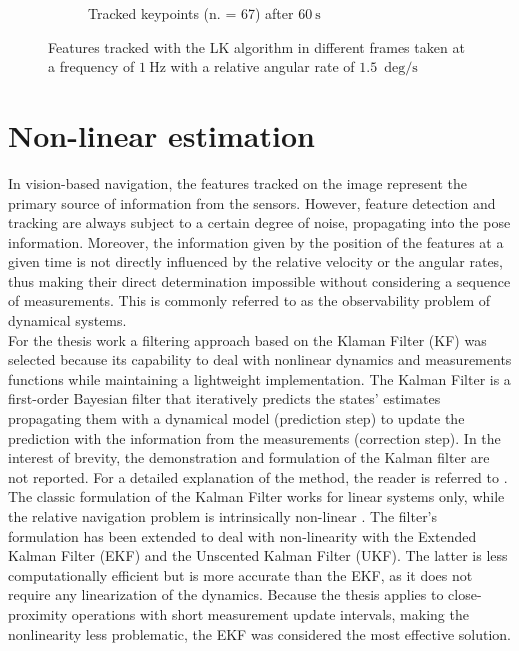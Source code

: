 \begin{figure}[!ht]
\begin{subfigure}[b]{0.32\textwidth}
         \caption{Tracked keypoints (n. = 67) after $\SI{60}{\second}$}
         \label{fig:t60}
     \end{subfigure}
        \caption[Features tracked with the LK algorithm]{Features tracked with the LK algorithm in different frames taken at a frequency of $\SI{1}{\hertz}$ with a relative angular rate of $\SI{1.5}{\deg\per\second}$}
        \label{fig:track}
\end{figure}


\section{Non-linear estimation}
In vision-based navigation, the features tracked on the image represent the primary source of information from the sensors. However, feature detection and tracking are always subject to a certain degree of noise, propagating into the pose information. Moreover, the information given by the position of the features at a given time is not directly influenced by the relative velocity or the angular rates, thus making their direct determination impossible without considering a sequence of measurements. This is commonly referred to as the observability problem of dynamical systems. \\
For the thesis work a filtering approach based on the Klaman Filter (KF) was selected because its capability to deal with nonlinear dynamics and measurements functions while maintaining a lightweight implementation. 
The Kalman Filter is a first-order Bayesian filter that iteratively predicts the states' estimates propagating them with a dynamical model (prediction step) to update the prediction with the information from the measurements (correction step). In the interest of brevity, the demonstration and formulation of the Kalman filter are not reported. For a detailed explanation of the method, the reader is referred to \cite{zarchan2005progress}.\\
The classic formulation of the Kalman Filter works for linear systems only, while the relative navigation problem is intrinsically non-linear \cite{pesce2019comparison}. The filter's formulation has been extended to deal with non-linearity with the Extended Kalman Filter (EKF) and the Unscented Kalman Filter (UKF). The latter is less computationally efficient but is more accurate than the EKF, as it does not require any linearization of the dynamics.
Because the thesis applies to close-proximity operations with short measurement update intervals, making the nonlinearity less problematic, the EKF was considered the most effective solution. 

